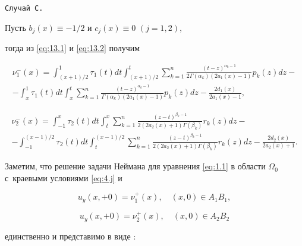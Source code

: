 \smallskip



\hypertarget{abd:C}{}



\texttt{Случай C.}

Пусть ${b_j}(x) \equiv  - {1}/{2}$  и ${c_j}(x) \equiv 0$ $(j = 1, 2),$ 

тогда из \eqref{eq:13.1} и \eqref{eq:13.2} получим

\begin{multline}

\nu _1^ - (x) =  \int _{({{x + 1}})/{2}}^1 {{\tau _1}(t)dt \int _{({{x + 1}})/{2}}^t {\sum\limits_{k = 1}^n {\frac{{{{(t - z)}^{{\alpha _k} - 1}}}}{{2\Gamma ({\alpha _k})\left( {2{a_1}(x) - 1} \right)}}} {p_k}(z)dz} }  - 

\\

-  \int _x^1 {{\tau _1}(t)dt \int _x^t {\sum\limits_{k = 1}^n {\frac{{{{(t - z)}^{{\alpha _k} - 1}}}}{{\Gamma ({\alpha _k})\left( {2{a_1}(x) - 1} \right)}}} {p_k}(z)dz} }  - \frac{{2{d_1}(x)}}{{2{a_1}(x) - 1}}, 

\label{eq:32.1}

\end{multline}

\begin{multline}

\nu _2^ - (x) =  \int _{ - 1}^x {{\tau _2}(t)dt \int _t^x {\sum\limits_{k = 1}^n {\frac{{{{(z - t)}^{{\beta _k} - 1}}}}{{2(2{a_2}(x) + 1)\Gamma ({\beta _k})}}{r_k}(z)dz} } }  - 

\\

-  \int _{ - 1}^{({{x - 1}})/{2}} {{\tau _2}(t)dt \int _t^{({{x - 1}})/{2}} {\sum\limits_{k = 1}^n {\frac{{{{(z - t)}^{{\beta _k} - 1}}}}{{2(2{a_2}(x) + 1)\Gamma ({\beta _k})}}{r_k}(z)dz} } }  - \frac{{2{d_2}(x)}}{{2{a_2}(x) + 1}}. \label{eq:32.2}

\end{multline}



Заметим, что решение задачи  Неймана для уравнения \eqref{eq:1.1} в области ${\Omega _0}$ с~краевыми условиями \eqref{eq:4.j} и

$${u_y}(x, +0) = {\nu _{1} ^+} (x), \quad (x, 0) \in {A_1}{B_1},$$

$${u_y}(x, +0) = {\nu _{2} ^+} (x),\quad (x, 0) \in {A_2}{B_2}$$

единственно и представимо в виде \cite{Islabd:bib:Islomabdul}:

